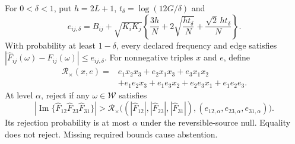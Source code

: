 \begin{theorem}
\label{cc16:cycle-theorem}
For $0<\delta<1$, put $h=2L+1$, $t_\delta=\log(12G/\delta)$ and
\begin{equation}
 e_{ij,\delta}=B_{ij}+\sqrt{K_iK_j}
 \left\{\frac{3h}{N}+2\sqrt{\frac{ht_\delta}{N}}
                  +\frac{\sqrt2\,ht_\delta}{N}\right\}.
 \label{cc16:edge-radius}
\end{equation}
With probability at least $1-\delta$, every declared frequency and edge satisfies
$|\widehat F_{ij}(\omega)-F_{ij}(\omega)|\le e_{ij,\delta}$.
For nonnegative triples $x$ and $e$, define
\begin{align}
 \mathcal R_\times(x,e)
 ={}&e_1x_2x_3+e_2x_1x_3+e_3x_1x_2\nonumber\\
 &+e_1e_2x_3+e_1e_3x_2+e_2e_3x_1+e_1e_2e_3.
 \label{cc16:product-radius}
\end{align}
At level $\alpha$, reject if any $\omega\in\mathcal W$ satisfies
\begin{equation}
 \left|\operatorname{Im}\{
 \widehat F_{12}\widehat F_{23}\widehat F_{31}\}\right|
 >\mathcal R_\times\bigl(
 (|\widehat F_{12}|,|\widehat F_{23}|,|\widehat F_{31}|),
 (e_{12,\alpha},e_{23,\alpha},e_{31,\alpha})\bigr).
 \label{cc16:cycle-rule}
\end{equation}
Its rejection probability is at most $\alpha$ under the reversible-source null. Equality does not reject. Missing required bounds cause abstention.
\end{theorem}
